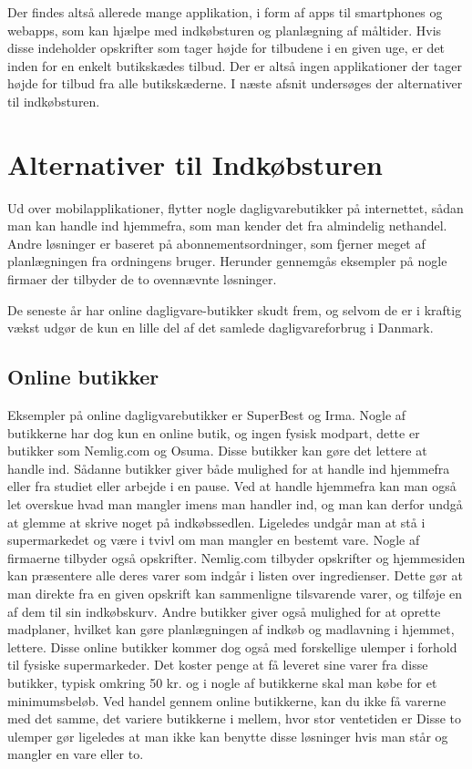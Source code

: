 Der findes altså allerede mange applikation, i form af apps til smartphones og webapps, som kan hjælpe med indkøbsturen og planlægning af måltider. Hvis disse indeholder opskrifter som tager højde for tilbudene i en given uge, er det inden for en enkelt butikskædes tilbud. Der er altså ingen applikationer der tager højde for tilbud fra alle butikskæderne. I næste afsnit undersøges der alternativer til indkøbsturen.

\section{Alternativer til Indkøbsturen}

Ud over mobilapplikationer, flytter nogle dagligvarebutikker på internettet, sådan man kan handle ind hjemmefra, som man kender det fra almindelig nethandel.
Andre løsninger er baseret på abonnementsordninger, som fjerner meget af planlægningen fra ordningens bruger.
Herunder gennemgås eksempler på nogle firmaer der tilbyder de to ovennævnte løsninger.

De seneste år har online dagligvare-butikker skudt frem, og selvom de er i kraftig vækst udgør de kun en lille del af det samlede dagligvareforbrug i Danmark\citep{SOTA_MP1}.

\subsection{Online butikker}
Eksempler på online dagligvarebutikker er SuperBest og Irma\citep{SOTA_MP_SB, SOTA_MP_IRMA}.
Nogle af butikkerne har dog kun en online butik, og ingen fysisk modpart, dette er butikker som Nemlig.com og Osuma\citep{SOTA_MP_NEMLIG, SOTA_MP_OSUMA}.
Disse butikker kan gøre det lettere at handle ind.
Sådanne butikker giver både mulighed for at handle ind hjemmefra eller fra studiet eller arbejde i en pause.
Ved at handle hjemmefra kan man også let overskue hvad man mangler imens man handler ind, og man kan derfor undgå at glemme at skrive noget på indkøbssedlen.
Ligeledes undgår man at stå i supermarkedet og være i tvivl om man mangler en bestemt vare.
Nogle af firmaerne tilbyder også opskrifter.
Nemlig.com tilbyder opskrifter og hjemmesiden kan præsentere alle deres varer som indgår i listen over ingredienser.
Dette gør at man direkte fra en given opskrift kan sammenligne tilsvarende varer, og tilføje en af dem til sin indkøbskurv.
Andre butikker giver også mulighed for at oprette madplaner, hvilket kan gøre planlægningen af indkøb og madlavning i hjemmet, lettere.
Disse online butikker kommer dog også med forskellige ulemper i forhold til fysiske supermarkeder.
Det koster penge at få leveret sine varer fra disse butikker, typisk omkring 50 kr. og i nogle af butikkerne skal man købe for et minimumsbeløb.
Ved handel gennem online butikkerne, kan du ikke få varerne med det samme, det variere butikkerne i mellem, hvor stor ventetiden er
Disse to ulemper gør ligeledes at man ikke kan benytte disse løsninger hvis man står og mangler en vare eller to.


